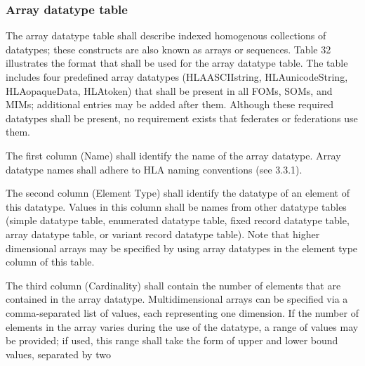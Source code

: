 \subsubsection{Array datatype table}
The array datatype table shall describe indexed homogenous collections of datatypes; these constructs are also known as arrays or sequences. Table 32 illustrates the format that shall be used for the array datatype table. The table includes four predefined array datatypes (HLAASCIIstring, HLAunicodeString, HLAopaqueData, HLAtoken) that shall be present in all FOMs, SOMs, and MIMs; additional entries may be added after them. Although these required datatypes shall be present, no requirement exists that federates or federations use them.

The first column (Name) shall identify the name of the array datatype. Array datatype names shall adhere to HLA naming conventions (see 3.3.1).

The second column (Element Type) shall identify the datatype of an element of this datatype. Values in this column shall be names from other datatype tables (simple datatype table, enumerated datatype table, fixed record datatype table, array datatype table, or variant record datatype table). Note that higher dimensional arrays may be specified by using array datatypes in the element type column of this table.

The third column (Cardinality) shall contain the number of elements that are contained in the array datatype. Multidimensional arrays can be specified via a comma-separated list of values, each representing one dimension. If the number of elements in the array varies during the use of the datatype, a range of values may be provided; if used, this range shall take the form of upper and lower bound values, separated by two

